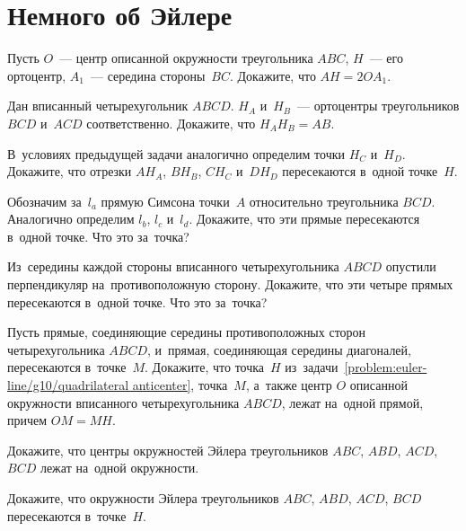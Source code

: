 

\section*{Немного об Эйлере}


\begin{problems}

\item
Пусть $O$~--- центр описанной окружности треугольника $ABC$,
$H$~--- его ортоцентр,
$A_1$~--- середина стороны~$BC$.
Докажите, что $AH = 2 O A_1$.

\item
Дан вписанный четырехугольник $ABCD$.
$H_A$ и~$H_B$~--- ортоцентры треугольников $BCD$ и~$ACD$ соответственно.
Докажите, что $H_A H_B = AB$.

\item\label{problem:euler-line/g10/quadrilateral anticenter}%
В~условиях предыдущей задачи аналогично определим точки $H_C$ и~$H_D$.
Докажите, что отрезки $A H_A$, $B H_B$, $C H_C$ и~$D H_D$ пересекаются
в~одной точке~$H$.

\item
Обозначим за~$l_a$ прямую Симсона точки~$A$ относительно треугольника $BCD$.
Аналогично определим $l_b$, $l_c$ и~$l_d$.
Докажите, что эти прямые пересекаются в~одной точке.
Что это за~точка?

\item
Из~середины каждой стороны вписанного четырехугольника $ABCD$ опустили
перпендикуляр на~противоположную сторону.
Докажите, что эти четыре прямых пересекаются в~одной точке.
Что это за~точка?

\item
Пусть прямые, соединяющие середины противоположных сторон четырехугольника
$ABCD$, и~прямая, соединяющая середины диагоналей, пересекаются в~точке~$M$.
Докажите, что точка~$H$
из~задачи~\ref{problem:euler-line/g10/quadrilateral anticenter},
точка~$M$, а~также центр $O$ описанной окружности вписанного четырехугольника
$ABCD$, лежат на~одной прямой, причем $OM = MH$.

\item
Докажите, что центры окружностей Эйлера треугольников
$ABC$, $ABD$, $ACD$, $BCD$ лежат на~одной окружности.

\item
Докажите, что окружности Эйлера треугольников $ABC$, $ABD$, $ACD$, $BCD$
пересекаются в~точке~$H$.

\end{problems}

